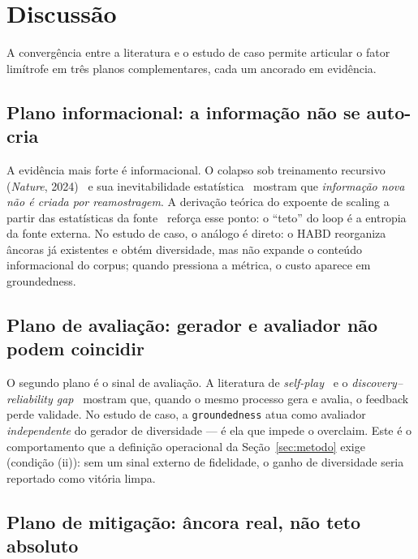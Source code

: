 \section{Discussão}\label{sec:disc}

A convergência entre a literatura e o estudo de caso permite articular o fator
limítrofe em três planos complementares, cada um ancorado em evidência.

\subsection{Plano informacional: a informação não se auto-cria}

A evidência mais forte é informacional. O colapso sob treinamento recursivo
(\emph{Nature}, 2024)~\parencite{Shumailov2024Collapse} e sua inevitabilidade
estatística~\parencite{Borji2024CollapseNote} mostram que \emph{informação nova
não é criada por reamostragem}. A derivação teórica do expoente de scaling a
partir das estatísticas da fonte~\parencite{Cagnetta2026ScalingTheory} reforça
esse ponto: o ``teto'' do loop é a entropia da fonte externa. No estudo de caso,
o análogo é direto: o HABD reorganiza âncoras já existentes e obtém diversidade,
mas não expande o conteúdo informacional do corpus; quando pressiona a métrica,
o custo aparece em groundedness.

\subsection{Plano de avaliação: gerador e avaliador não podem coincidir}

O segundo plano é o sinal de avaliação. A literatura de
\emph{self-play}~\parencite{SelfPlayGuidance2026} e o
\emph{discovery--reliability gap}~\parencite{RSIBench2026} mostram que, quando o
mesmo processo gera e avalia, o feedback perde validade. No estudo de caso, a
\texttt{groundedness} atua como avaliador \emph{independente} do gerador de
diversidade --- é ela que impede o overclaim. Este é o comportamento que a
definição operacional da Seção~\ref{sec:metodo} exige (condição (ii)): sem um
sinal externo de fidelidade, o ganho de diversidade seria reportado como vitória
limpa.

\subsection{Plano de mitigação: âncora real, não teto absoluto}

